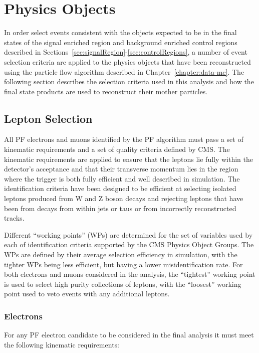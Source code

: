 \section{Physics Objects}\label{sec:physicsObjects}
In order select events consistent with the objects expected to be in the final states of the signal enriched region and background enriched control regions described in Sections~\ref{sec:signalRegion}-\ref{sec:controlRegions}, a number of event selection criteria are applied to the physics objects that have been reconstructed using the particle flow algorithm described in Chapter~\ref{chapter:data-mc}.
The following section describes the selection criteria used in this analysis and how the final state products are used to reconstruct their mother particles.

\subsection{Lepton Selection}
All PF electrons and muons identified by the PF algorithm must pass a set of kinematic requirements and a set of quality criteria defined by CMS.
The kinematic requirements are applied to ensure that the leptons lie fully within the detector's acceptance and that their transverse momentum lies in the region where the trigger is both fully efficient and well described in simulation.
The identification criteria have been designed to be efficient at selecting isolated leptons produced from W and Z boson decays and rejecting leptons that have been from decays from within jets or taus or from incorrectly reconstructed tracks.

Different ``working points'' (WPs) are determined for the set of variables used by each of identification criteria supported by the CMS Physics Object Groups.
The WPs are defined by their average selection efficiency in simulation, with the tighter WPs being less efficient, but having a lower misidentification rate.
For both electrons and muons  considered in the analysis, the ``tightest'' working point is used to select high purity collections of leptons, with the ``loosest'' working point used to veto events with any additional leptons.

\subsubsection{Electrons}\label{subsubsec:electronSelection}
For any PF electron candidate to be considered in the final analysis it must meet the following kinematic requirements:

